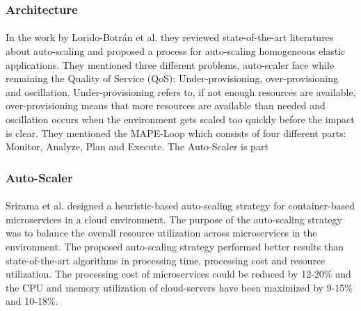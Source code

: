 \subsubsection{Architecture}
\paragraph{} In the work by Lorido-Botrán et al.  they reviewed state-of-the-art literatures about auto-scaling and proposed a process for auto-scaling homogeneous elastic applications. They mentioned three different problems, auto-scaler face while remaining the Quality of Service (QoS): Under-provisioning, over-provisioning and oscillation. Under-provisioning refers to, if not enough resources are available, over-provisioning means that more resources are available than needed and oscillation occurs when the environment gets scaled too quickly before the impact is clear. They mentioned the MAPE-Loop which consists of four different parts: Monitor, Analyze, Plan and Execute.  The Auto-Scaler is part 


\subsubsection{Auto-Scaler}
\paragraph{}Srirama et al. \citep{Srirama2020AppDeplyCont} designed a heuristic-based auto-scaling strategy for container-based microservices in a cloud environment. The purpose of the auto-scaling strategy was to balance the overall resource utilization across microservices in the environment.
The proposed auto-scaling strategy performed better results than state-of-the-art algorithms in processing time, processing cost and resource utilization. The processing cost of microservices could be reduced by 12-20\% and the CPU and memory utilization of cloud-servers have been maximized by 9-15\% and 10-18\%.


